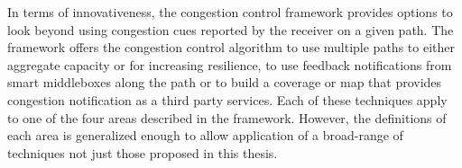 

In terms of innovativeness, the congestion control framework provides options
to look beyond using congestion cues reported by the receiver on a given path.
The framework offers the congestion control algorithm to use multiple paths to
either aggregate capacity or for increasing resilience, to use feedback
notifications from smart middleboxes along the path or to build a coverage or
map that provides congestion notification as a third party services. Each of
these techniques apply to one of the four areas described in the framework.
However, the definitions of each area is generalized enough to allow
application of a broad-range of techniques not just those proposed in this
thesis.



